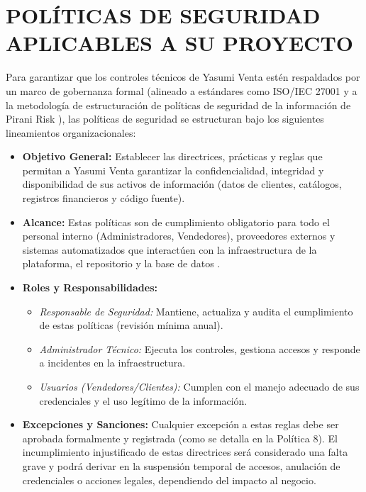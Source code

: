 \documentclass[12pt,letterpaper]{article}
\newcommand{\cod}[1]{\path{#1}}
\begin{document}
\section{POLÍTICAS DE SEGURIDAD APLICABLES A SU PROYECTO}

Para garantizar que los controles técnicos de Yasumi Venta estén respaldados por un marco de gobernanza formal (alineado a estándares como ISO/IEC 27001 \cite{iso27001} y a la metodología de estructuración de políticas de seguridad de la información de Pirani Risk \cite{pirani}), las políticas de seguridad se estructuran bajo los siguientes lineamientos organizacionales:

\begin{itemize}
    \item \textbf{Objetivo General:} Establecer las directrices, prácticas y reglas que permitan a Yasumi Venta garantizar la confidencialidad, integridad y disponibilidad de sus activos de información (datos de clientes, catálogos, registros financieros y código fuente).
    \item \textbf{Alcance:} Estas políticas son de cumplimiento obligatorio para todo el personal interno (Administradores, Vendedores), proveedores externos y sistemas automatizados que interactúen con la infraestructura de la plataforma, el repositorio \cod{back-seguridad} y la base de datos \cod{bd\_yasumi}.
    \item \textbf{Roles y Responsabilidades:}
    \begin{itemize}
        \item \textit{Responsable de Seguridad:} Mantiene, actualiza y audita el cumplimiento de estas políticas (revisión mínima anual).
        \item \textit{Administrador Técnico:} Ejecuta los controles, gestiona accesos y responde a incidentes en la infraestructura.
        \item \textit{Usuarios (Vendedores/Clientes):} Cumplen con el manejo adecuado de sus credenciales y el uso legítimo de la información.
    \end{itemize}
    \item \textbf{Excepciones y Sanciones:} Cualquier excepción a estas reglas debe ser aprobada formalmente y registrada (como se detalla en la Política 8). El incumplimiento injustificado de estas directrices será considerado una falta grave y podrá derivar en la suspensión temporal de accesos, anulación de credenciales o acciones legales, dependiendo del impacto al negocio.
\end{itemize}
\end{document}
